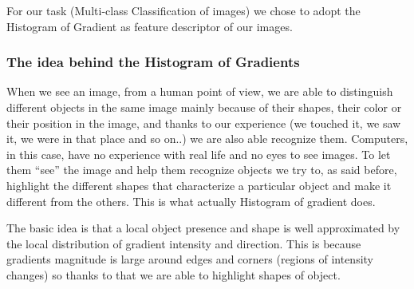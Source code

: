 \documentclass{article}
\begin{document}
For our task (Multi-class Classification of images) we chose to adopt the Histogram of Gradient as feature descriptor of our images.

\subsubsection {The idea behind the Histogram of Gradients}

When we see an image, from a human point of view, we are able to distinguish different objects in the same image mainly because of their shapes, their color or their position in the image, and thanks to our experience (we touched it, we saw it, we were in that place and so on..) we are also able recognize them. Computers, in this case, have no experience with real life and no eyes to see images. To let them “see” the image and help them recognize objects we try to, as said before, highlight the different shapes that characterize a particular object and make it different from the others. This is what actually Histogram of gradient does.

The basic idea is that a local object presence and shape is well approximated by the local distribution of gradient intensity and direction. This is because gradients magnitude is large around edges and corners (regions of intensity changes) so thanks to that we are able to highlight shapes of object. 
\end{document}
